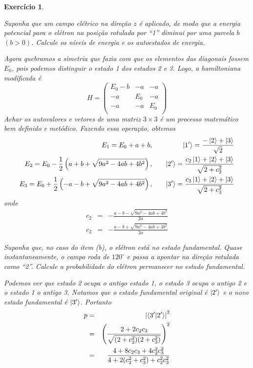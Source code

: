 \documentclass[12pt]{article}
\def\be{\begin{equation}}
\def\ee{\end{equation}}
\def\bea{\begin{eqnarray*}}
\def\eea{\end{eqnarray*}}
\def\f{\frac}
\def\l{\left}
\def\r{\right}
\newtheorem{exercise}{Exercício}
\begin{document}
\begin{exercise}
\begin{exercises}
			\item Suponha que um campo elétrico na direção $z$ é aplicado, de modo que a energia potencial para o elétron na posição rotulada por “1” diminui por uma parcela $b$
			$(b>0)$. Calcule os níveis de energia e os autoestados de energia.
			\begin{multianswer}
				Agora quebramos a simetria que fazia com que os elementos das diagonais fossem $E_0$, pois podemos distinguir o estado 1 dos estados 2 e 3. Logo, a hamiltoniana modificada é 
				\be
				H = 
				\begin{pmatrix}
					E_0 - b & -a & -a \\
					-a & E_0 & -a \\
					-a & -a & E_0 \\
				\end{pmatrix}
				\ee
				Achar os autovalores e vetores de uma matriz $3\times3$ é um processo matemático bem definido e metódico. Fazendo essa operação, obtemos
				\bea
					E_1 = E_0 + a + b, &\quad& \ket{1'} = \f{-\ket{2} + \ket{3}}{\sqrt{2}} \\
					E_2 = E_0 - \f{1}{2}\l( a + b + \sqrt{9a^2 - 4ab + 4b^2}\r), &\quad& \ket{2'} = \f{c_2\ket{1} +\ket{2} + \ket{3}}{\sqrt{2+c_2^2}} \\
					E_3 = E_0 + \f{1}{2}\l( -a - b + \sqrt{9a^2 - 4ab + 4b^2}\r), &\quad& \ket{3'} = \f{c_3\ket{1} +\ket{2} + \ket{3}}{\sqrt{2+c_3^2}}
				\eea
				onde
				\bea
					c_2 &=& - \f{a -b - \sqrt{9a^2 -4ab + 4b^2}}{2a} \\
					c_2 &=& - \f{a -b + \sqrt{9a^2 -4ab + 4b^2}}{2a} 
				\eea
			\end{multianswer}
		
			\item Suponha que, no caso do item (b), o elétron está no estado fundamental.
			Quase instantaneamente, o campo roda de $120^\circ$ e passa a apontar na direção
			rotulada como “2”. Calcule a probabilidade do elétron permanecer no estado fundamental.
			\begin{multianswer}[true]
				Podemos ver que estado 2 ocupa o antigo estado 1, o estado 3 ocupa o antigo 2 e o estado 1 o antigo 3. Notamos que o estado fundamental original é $\ket{2'}$ e o novo estado fundamental é $\ket{3'}$. Portanto
				\bea
					p &=& \l| \braket{3' | 2'} \r|^2 \\
						&=& \l(\f{2 + 2c_2c_3}{\sqrt{(2+c_2^2)(2+c_3^2)}}\r)^2 \\
						&=& \f{4 + 8c_2c_3 + 4c_2^2c_3^2}{4 + 2(c_2^2+c_3^2)+c_2^2c_3^2}
				\eea
			\end{multianswer}
			
		\end{exercises}
	\end{exercise}
	
\end{document}

